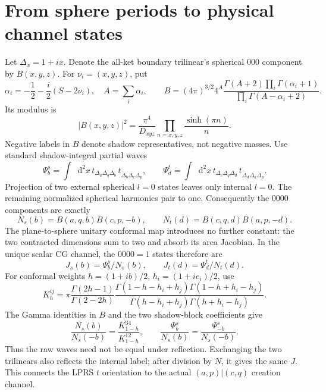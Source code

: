 \documentclass[11pt,a4paper]{article}
\newcommand{\dd}{\mathop{}\!\mathrm d}
\begin{document}
\section{From sphere periods to physical channel states}
Let $\Delta_x=1+ix$. Denote the all-ket boundary trilinear's spherical
$000$ component by $B(x,y,z)$. For $\nu_i=(x,y,z)$, put
\[
 \alpha_i=-\frac12-\frac i2(S-2\nu_i),\quad A=\sum_i\alpha_i,\qquad
 B=(4\pi)^{3/2}4^A
 \frac{\Gamma(A+2)\prod_i\Gamma(\alpha_i+1)}
 {\prod_i\Gamma(A-\alpha_i+2)} .
\]
Its modulus is
\begin{equation}
 |B(x,y,z)|^2=\frac{\pi^4}{D_{xyz}}
                 \prod_{n=x,y,z}\frac{\sinh(\pi n)}n .
 \label{Bnorm}
\end{equation}
Negative labels in $B$ denote shadow representatives, not negative masses.
Use standard shadow-integral partial waves
\[
 \Psi_b^s=\int\dd^2x\,
  t_{\Delta_a\Delta_q\Delta_b}\,
  t_{\widetilde\Delta_b\Delta_c\Delta_p},
 \qquad
 \Psi_d^t=\int\dd^2x\,
  t_{\Delta_c\Delta_q\Delta_d}\,
  t_{\widetilde\Delta_d\Delta_a\Delta_p}.
\]
Projection of two external spherical $l=0$ states leaves only internal
$l=0$. The remaining normalized spherical harmonics pair to one.
Consequently the $0000$ components are exactly
\begin{equation}
 N_s(b)=B(a,q,b)B(c,p,-b),\qquad
 N_t(d)=B(c,q,d)B(a,p,-d).
 \label{Ns}
\end{equation}
The plane-to-sphere unitary conformal map introduces no further constant:
the two contracted dimensions sum to two and absorb its area Jacobian.
In the unique scalar CG channel, the $0000=1$ states therefore are
\begin{equation}
 J_s(b)=\Psi_b^s/N_s(b),\qquad J_t(d)=\Psi_d^t/N_t(d).
 \label{Jnorm}
\end{equation}
For conformal weights $h=(1+ib)/2$, $h_i=(1+ie_i)/2$, use
\[
 K_h^{ij}=\pi\frac{\Gamma(2h-1)}{\Gamma(2-2h)}
 \frac{\Gamma(1-h-h_i+h_j)\Gamma(1-h+h_i-h_j)}
 {\Gamma(h-h_i+h_j)\Gamma(h+h_i-h_j)} .
\]
The Gamma identities in $B$ and the two shadow-block coefficients give
\begin{equation}
 \frac{N_s(b)}{N_s(-b)}=\frac{K_{1-h}^{34}}{K_{1-h}^{12}},
 \qquad
 \frac{\Psi_b^s}{N_s(b)}=\frac{\Psi_{-b}^s}{N_s(-b)} .
 \label{reflection}
\end{equation}
Thus the raw waves need not be equal under reflection. Exchanging the
two trilinears also reflects the internal label; after division by
$N$, it gives the same $J$. This connects the LPRS $t$ orientation to
the actual $(a,p)|(c,q)$ creation channel.
\end{document}
